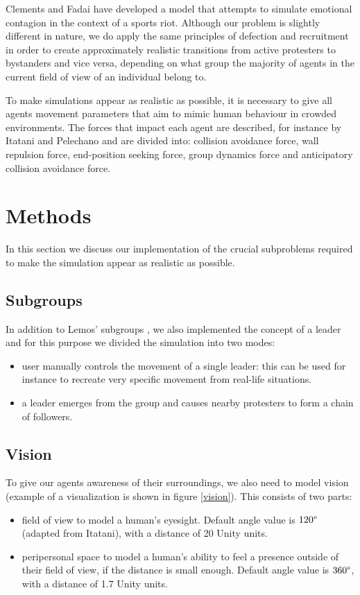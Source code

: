 \documentclass[9pt]{pnas-new}
\begin{document}
\bigskip
Clements and Fadai \cite{sportsriots} have developed a model that attempts to simulate emotional contagion in the context of a sports riot. Although our problem is slightly different in nature, we do apply the same principles of defection and recruitment in order to create approximately realistic transitions from active protesters to bystanders and vice versa, depending on what group the majority of agents in the current field of view of an individual belong to. 

\bigskip
To make simulations appear as realistic as possible, it is necessary to give all agents movement parameters that aim to mimic human behaviour in crowded environments. The forces that impact each agent are described, for instance by Itatani and Pelechano \cite{socialcrowdsimulation} and are divided into: collision avoidance force, wall repulsion force, end-position seeking force, group dynamics force and anticipatory collision avoidance force. 

\section*{Methods}

In this section we discuss our implementation of the crucial subproblems required to make the simulation appear as realistic as possible. 

\subsection*{Subgroups}
In addition to Lemos' subgroups \cite{protests}, we also implemented the concept of a leader and for this purpose we divided the simulation into two modes:
\begin{itemize}
    \item user manually controls the movement of a single leader: this can be used for instance to recreate very specific movement from real-life situations.
    \item a leader emerges from the group and causes nearby protesters to form a chain of followers.
\end{itemize}

\subsection*{Vision}
To give our agents awareness of their surroundings, we also need to model vision (example of a visualization is shown in figure \ref{vision}). This consists of two parts: 
\begin{itemize}
    \item field of view to model a human's eyesight. Default angle value is \begin{math}120\degree\end{math} (adapted from Itatani), with a distance of 20 Unity units.
    \item peripersonal space to model a human's ability to feel a presence outside of their field of view, if the distance is small enough. Default angle value is \begin{math}360\degree\end{math}, with a distance of 1.7 Unity units.
\end{itemize}
\end{document}
